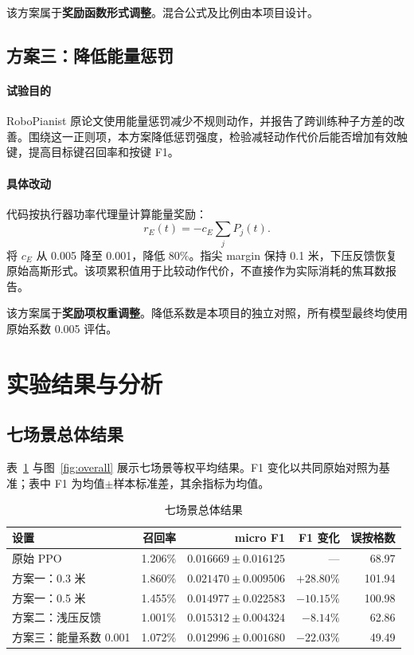 \documentclass[UTF8,a4paper,11pt]{ctexart}
\begin{document}
该方案属于\textbf{奖励函数形式调整}。混合公式及比例由本项目设计。

\subsection{方案三：降低能量惩罚}

\paragraph{试验目的}
RoboPianist 原论文使用能量惩罚减少不规则动作，并报告了跨训练种子方差的改善\cite{robopianist}。围绕这一正则项，本方案降低惩罚强度，检验减轻动作代价后能否增加有效触键，提高目标键召回率和按键 F1。

\paragraph{具体改动}
代码按执行器功率代理量计算能量奖励：
\begin{equation}
r_E(t)=-c_E\sum_j P_j(t).
\end{equation}
将 $c_E$ 从 0.005 降至 0.001，降低 80\%。指尖 margin 保持 0.1 米，下压反馈恢复原始高斯形式。该项累积值用于比较动作代价，不直接作为实际消耗的焦耳数报告。

该方案属于\textbf{奖励项权重调整}。降低系数是本项目的独立对照，所有模型最终均使用原始系数 0.005 评估。

\section{实验结果与分析}

\subsection{七场景总体结果}

表~\ref{tab:overall} 与图~\ref{fig:overall} 展示七场景等权平均结果。F1 变化以共同原始对照为基准；表中 F1 为均值$\pm$样本标准差，其余指标为均值。

\begin{table}[H]
\centering
\small
\caption{七场景总体结果}
\label{tab:overall}
\setlength{\tabcolsep}{3pt}
\begin{tabularx}{\textwidth}{@{}Xrrrr@{}}
\toprule
设置 & 召回率 & micro F1 & F1 变化 & 误按格数 \\
\midrule
原始 PPO & 1.206\% & $0.016669\pm0.016125$ & --- & 68.97 \\
方案一：0.3 米 & 1.860\% & $0.021470\pm0.009506$ & $+28.80\%$ & 101.94 \\
方案一：0.5 米 & 1.455\% & $0.014977\pm0.022583$ & $-10.15\%$ & 100.98 \\
方案二：浅压反馈 & 1.001\% & $0.015312\pm0.004324$ & $-8.14\%$ & 62.86 \\
方案三：能量系数 0.001 & 1.072\% & $0.012996\pm0.001680$ & $-22.03\%$ & 49.49 \\
\bottomrule
\end{tabularx}
\end{table}
\end{document}

